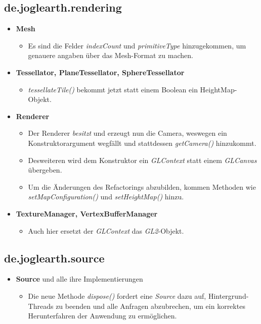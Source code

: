 \documentclass[10pt]{scrreprt}
\begin{document}
\subsection*{de.joglearth.rendering}
\begin{itemize}
\item \textbf{Mesh} \begin{itemize}
\item Es sind die Felder \textit{indexCount} und \textit{primitiveType} hinzugekommen, um genauere angaben über das Mesh-Format zu machen.
\end{itemize}
\item \textbf{Tessellator, PlaneTessellator, SphereTessellator} \begin{itemize}
\item \textit{tessellateTile()} bekommt jetzt statt einem Boolean ein HeightMap-Objekt.
\end{itemize}
\item \textbf{Renderer} \begin{itemize}
\item Der Renderer \textit{besitzt} und erzeugt nun die Camera, weswegen ein Konstruktorargument wegfällt und stattdessen \textit{getCamera()} hinzukommt.
\item Desweiteren wird dem Konstruktor ein \textit{GLContext} statt einem \textit{GLCanvas} übergeben.
\item Um die Änderungen des Refactorings abzubilden, kommen Methoden wie \textit{setMapConfiguration()} und \textit{setHeightMap()} hinzu.
\end{itemize}
\item \textbf{TextureManager, VertexBufferManager} \begin{itemize}
\item Auch hier ersetzt der \textit{GLContext} das \textit{GL2}-Objekt.
\end{itemize}
\end{itemize}

\subsection*{de.joglearth.source}
\begin{itemize}
\item \textbf{Source} und alle ihre Implementierungen \begin{itemize}
\item Die neue Methode \textit{dispose()} fordert eine \textit{Source} dazu auf, Hintergrund-Threads zu beenden und alle Anfragen abzubrechen, um ein korrektes Herunterfahren der Anwendung zu ermöglichen.
\end{itemize}
\end{itemize}
\end{document}
